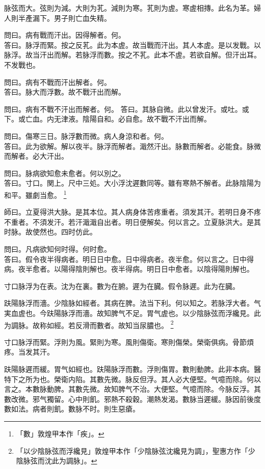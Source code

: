 脉弦而大。弦則为減。大則为芤。減則为寒。芤則为虗。寒虗相摶。此名为革。婦人則半產漏下。男子則亡血失精。

問曰。病有戰而汗出。因得解者。何。\\
答曰。脉浮而緊。按之反芤。此为本虗。故当戰而汗出。其人本虗。是以发戰。以脉浮。故当汗出而解。若脉浮而數。按之不芤。此本不虗。若欲自解。但汗出耳。不发戰也。

問曰。病有不戰而汗出解者。何。\\
答曰。脉大而浮數。故不戰汗出而解。

問曰。病有不戰不汗出而解者。何。
答曰。其脉自微。此以曾发汗。或吐。或下。或亡血。内无津液。陰陽自和。必自愈。故不戰不汗出而解。

問曰。傷寒三日。脉浮數而微。病人身涼和者。何。\\
答曰。此为欲解。解以夜半。脉浮而解者。濈然汗出。脉數而解者。必能食。脉微而解者。必大汗出。

問曰。脉病欲知愈未愈者。何以別之。\\
答曰。寸口。関上。尺中三処。大小浮沈遲數同等。雖有寒熱不解者。此脉陰陽为和平。雖劇当愈。
	\footnote{「數」敦煌甲本作「疾」。}

師曰。立夏得洪大脉。是其本位。其人病身体苦疼重者。須发其汗。若明日身不疼不重者。不須发汗。若汗濈濈自出者。明日便解矣。何以言之。立夏脉洪大。是其时脉。故使然也。四时仿此。

問曰。凡病欲知何时得。何时愈。\\
答曰。假令夜半得病者。明日日中愈。日中得病者。夜半愈。何以言之。日中得病。夜半愈者。以陽得陰則解也。夜半得病。明日日中愈者。以陰得陽則解也。

寸口脉浮为在表。沈为在裏。數为在腑。遲为在臓。假令脉遲。此为在臓。

趺陽脉浮而濇。少陰脉如經者。其病在脾。法当下利。何以知之。若脉浮大者。气実血虗也。今趺陽脉浮而濇。故知脾气不足。胃气虗也。以少陰脉弦而浮纔見。此为調脉。故称如經。若反滑而數者。故知当尿膿也。
	\footnote{「以少陰脉弦而浮纔見」敦煌甲本作「少陰脉弦沈纔見为調」，聖惠方作「少陰脉弦而沈此为調脉」。}

寸口脉浮而緊。浮則为風。緊則为寒。風則傷衛。寒則傷榮。榮衛俱病。骨節煩疼。当发其汗。

趺陽脉遲而緩。胃气如經也。趺陽脉浮而數。浮則傷胃。數則動脾。此非本病。醫特下之所为也。榮衛内陷。其數先微。脉反但浮。其人必大便堅。气噫而除。何以言之。本數脉動脾。其數先微。故知脾气不治。大便堅。气噫而除。今脉反浮。其數改微。邪气獨留。心中則飢。邪熱不殺穀。潮熱发渴。數脉当遲緩。脉因前後度數如法。病者則飢。數脉不时。則生惡瘡。

